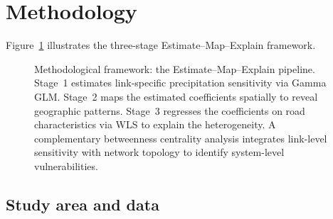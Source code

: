 \documentclass[review]{elsarticle}
\begin{document}
\section{Methodology}
\label{sec:method}

Figure~\ref{fig:framework} illustrates the three-stage Estimate--Map--Explain framework.

\begin{figure}[htbp]
\centering
\caption{Methodological framework: the Estimate--Map--Explain pipeline. Stage~1 estimates link-specific precipitation sensitivity via Gamma GLM. Stage~2 maps the estimated coefficients spatially to reveal geographic patterns. Stage~3 regresses the coefficients on road characteristics via WLS to explain the heterogeneity. A complementary betweenness centrality analysis integrates link-level sensitivity with network topology to identify system-level vulnerabilities.}
\label{fig:framework}
\end{figure}


\subsection{Study area and data}
\label{sec:method:data}
\end{document}

